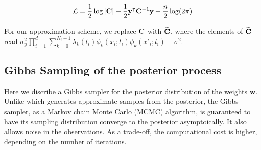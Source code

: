 \documentclass{article}
\begin{document}
\begin{equation}\label{}
	\mathcal{L} = \frac{1}{2} \log |{\bf C}| + \frac{1}{2} {\bf y}^\intercal {\bf C}^{-1} {\bf y} +\frac{n}{2} \log(2 \pi) 
\end{equation}

For our approximation scheme, we replace ${\bf C}$ with $\widetilde{\bf C}$, where the elements of $\widetilde{\bf C}$ read $\sigma^2_\text{p} \prod_{i=1}^{d} \sum_{k=0}^{N_i-1} \lambda_k (l_i) \phi_k(x_i;l_i) \phi_k(x'_i;l_i) + \sigma^2$.

%


\subsection{Gibbs Sampling of the posterior process}
\label{sec:Gibbs}

Here we discribe a Gibbs sampler for the posterior distribution of the weights $\mathbf{w}$.
Unlike  which generates approximate samples from the posterior,
the Gibbs sampler, as a Markov chain Monte Carlo (MCMC) algorithm,
is guaranteed to have its sampling distribution converge to the posterior asymptoically.
It also allows noise in the observations.
As a trade-off, the computational cost is higher, depending on the number of iterations.
\end{document}
